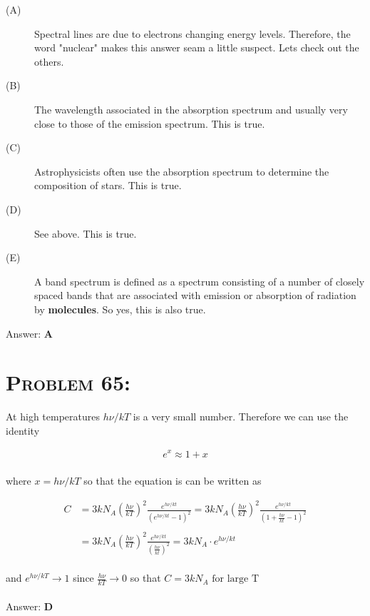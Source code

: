 \documentclass{article}
\begin{document}
\begin{description}
\item[(A)] Spectral lines are due to electrons changing energy levels. Therefore, the word "nuclear" makes this answer seam a little suspect. Lets check out the others.

\item[(B)] The wavelength associated in the absorption spectrum and usually very close to those of the emission spectrum. This is true.

 \item[(C)] Astrophysicists often use the absorption spectrum to determine the composition of stars. This is true.

 \item[(D)] See above. This is true.

 \item[(E)] A band spectrum is defined as a spectrum consisting of a number of closely spaced bands that are associated with emission or absorption of radiation by \textbf{molecules}. So yes, this is also true.
\end{description}
Answer: \textbf{\textcolor{ProcessBlue}A}\\


\section{\textsc{Problem 65:}} At high temperatures $h \nu/kT$  is a very small number. Therefore we can use the identity

\begin{gather}
e^{x} \approx 1+x
\end{gather}
\\
where $x = h \nu/kT$ so that the equation is can be written as

\begin{align}
C &= 3kN_{A} \left(  \frac{h\nu}{kT}  \right)^{2} \frac{e^{h\nu/kt}}{\left(   e^{h\nu/kt} - 1    \right)^{2}} = 3kN_{A} \left(  \frac{h\nu}{kT}  \right)^{2} \frac{e^{h\nu/kt}}{\left( 1+  \frac{h\nu}{kt} - 1    \right)^{2}} \nonumber\\
\nonumber\\
&= 3kN_{A} \left(  \frac{h\nu}{kT}  \right)^{2} \frac{e^{h\nu/kt}}{\left( \frac{h\nu}{kt} \right)^{2}} = 3kN_{A} \cdot  e^{h\nu/kt}\nonumber
\end{align}
\\
and $e^{h\nu/kT} \rightarrow 1$ since $\frac{h\nu}{kT} \rightarrow 0$ so that $\boxed{C = 3kN_{A} \text{ for large T}}$
\\\\
Answer: \textbf{\textcolor{ProcessBlue}D}\\
\end{document}
